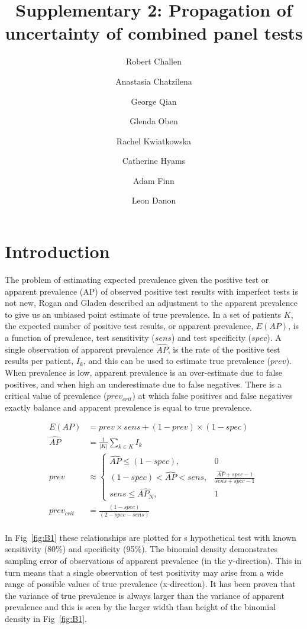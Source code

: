 \documentclass[a4paper, 12pt, twoside]{article}
\title{Supplementary 2: Propagation of uncertainty of combined panel tests}
\author[1]{Robert Challen}
\author[1]{Anastasia Chatzilena}
\author[1]{George Qian}
\author[1]{Glenda Oben}
\author[2,3]{Rachel Kwiatkowska}
\author[1]{Catherine Hyams}
\author[1]{Adam Finn}
\author[1]{Leon Danon}
\affil[1]{Bristol Vaccine Centre, University of Bristol. UK.}
\affil[2]{Population Health Sciences, University of Bristol. UK.}
\affil[3]{NIHR Health Protection Unit in Behavioural Science and Evaluation, University of Bristol. UK.}
\date{}                     %
\let\Oldsection\section
\renewcommand{\section}{\FloatBarrier\Oldsection}
\begin{document}
\maketitle


\section{Introduction}

The problem of estimating expected prevalence given the positive test or apparent prevalence (AP) of observed positive test results with imperfect tests is not new, Rogan and Gladen \cite{rogan1978} described an adjustment to the apparent prevalence to give us an unbiased point estimate of true prevalence. In a set of patients \(K\), the expected number of positive test results, or apparent prevalence, \(E(AP)\), is a function of prevalence, test sensitivity (\(sens\)) and test specificity (\(spec\)). A single observation of apparent prevalence \(\widehat{AP}\), is the rate of the positive test results per patient, \(I_k\), and this can be used to estimate true prevalence (\(prev\)). When prevalence is low, apparent prevalence is an over-estimate due to false positives, and when high an underestimate due to false negatives. There is a critical value of prevalence (\(prev_{crit}\)) at which false positives and false negatives exactly balance and apparent prevalence is equal to true prevalence.

\begin{equation*}
\begin{aligned}
E(AP) &= prev \times sens + (1-prev) \times (1-spec) \\
\widehat{AP} &= \frac{1}{|K|}\sum_{k \in K}{I_k} \\
prev &\approx \begin{cases}
    \widehat{AP} \le (1-spec), & 0 \\
    (1-spec) < \widehat{AP} < sens, & \frac{\widehat{AP} + spec -1}{sens + spec - 1} \\
    sens \le \widehat{AP_N}, & 1
  \end{cases} \\
prev_{crit} &= \frac{(1-spec)}{(2-spec-sens)} \\
\end{aligned}
\end{equation*}

In Fig~\ref{fig:B1} these relationships are plotted for s hypothetical test with known sensitivity (80\%) and specificity (95\%). The binomial density demonstrates sampling error of observations of apparent prevalence (in the y-direction). This in turn means that a single observation of test positivity may arise from a wide range of possible values of true prevalence (x-direction). It has been proven that the variance of true prevalence is always larger than the variance of apparent prevalence \cite{rogan1978, lang2014} and this is seen by the larger width than height of the binomial density in Fig~\ref{fig:B1}.
\end{document}
